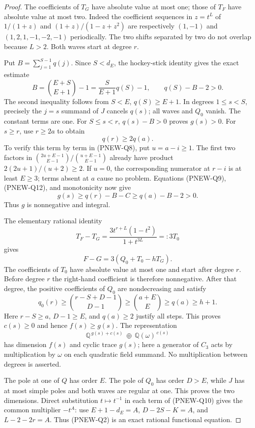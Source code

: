 \begin{proof}
The coefficients of $T_G$ have absolute value at most one; those of
$T_F$ have absolute value at most two. Indeed the coefficient sequences
in $z=t^L$ of $1/(1+z)$ and $(1+z)/(1-z+z^2)$ are respectively
$(1,-1)$ and $(1,2,1,-1,-2,-1)$ periodically. The two shifts separated
by two do not overlap because $L>2$. Both waves start at degree $r$.

Put $B=\sum_{j=1}^{S-1}q(j)$. Since $S<d_E$, the hockey-stick identity
gives the exact estimate
\[
 B=\binom{E+S}{E+1}-1
   =\frac{S}{E+1}q(S)-1,
 \qquad q(S)-B-2>0.
 \tag{PNEW-Q12}
\]
The second inequality follows from $S<E$, $q(S)\ge E+1$.
In degrees $1\le s<S$, precisely the $j=s$ summand of $J$
cancels $q(s)$; all waves and $Q_0$ vanish. The constant terms are one.
For $S\le s<r$, $q(s)-B>0$ proves $g(s)>0$.
For $s\ge r$, use $r\ge2a$ to obtain
\[
                         q(r)\ge2q(a).
 \tag{PNEW-Q13}
\]
To verify this term by term in (PNEW-Q8), put $u=a-i\ge1$.
The first two factors in
$\binom{2u+E-1}{E-1}/\binom{u+E-1}{E-1}$ already have product
$2(2u+1)/(u+2)\ge2$. If $u=0$, the corresponding numerator at
$r-i$ is at least $E\ge3$; terms absent at $a$ cause no problem.
Equations (PNEW-Q9), (PNEW-Q12), and monotonicity now give
\[
               g(s)\ge q(r)-B-C\ge q(a)-B-2>0.
 \tag{PNEW-Q14}
\]
Thus $g$ is nonnegative and integral.

The elementary rational identity
\[
 T_F-T_G=\frac{3t^{r+L}(1-t^2)}{1+t^{3L}}=:3T_0
 \tag{PNEW-Q15}
\]
gives
\[
                         F-G=3(Q_0+T_0-hT_G).
 \tag{PNEW-Q16}
\]
The coefficients of $T_0$ have absolute value at most one and start
after degree $r$. Before degree $r$ the right-hand coefficient is
therefore nonnegative. After that degree, the positive coefficients
of $Q_0$ are nondecreasing and satisfy
\[
 q_0(r)\ge\binom{r-S+D-1}{D-1}
          \ge\binom{a+E}{E}\ge q(a)\ge h+1.
 \tag{PNEW-Q17}
\]
Here $r-S\ge a$, $D-1\ge E$, and $q(a)\ge2$ justify all steps.
This proves $c(s)\ge0$ and hence $f(s)\ge g(s)$. The representation
\[
       \mathbb Q^{\,g(s)+c(s)}\ \oplus\
                 \mathbb Q(\omega)^{\,c(s)}
 \tag{PNEW-Q18}
\]
has dimension $f(s)$ and cyclic trace $g(s)$; here a generator of
$C_3$ acts by multiplication by $\omega$ on each quadratic field
summand. No multiplication between degrees is asserted.

The pole at one of $Q$ has order $E$. The pole of $Q_0$ has order
$D>E$, while $J$ has at most simple poles and both waves are regular
at one. This proves the two dimensions. Direct substitution $t\mapsto
t^{-1}$ in each term of (PNEW-Q10) gives the common multiplier
$-t^A$: use $E+1-d_E=A$, $D-2S-K=A$, and $L-2-2r=A$.
Thus (PNEW-Q2) is an exact rational functional equation.


\end{proof}
